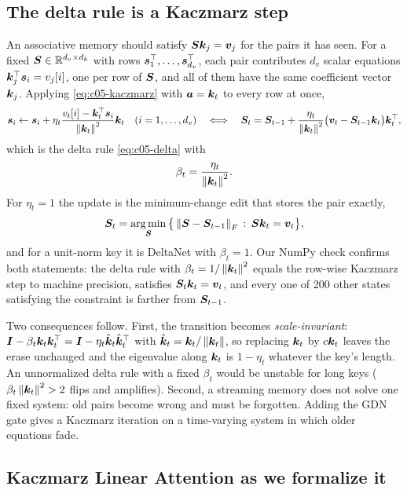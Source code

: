 \subsection{The delta rule is a Kaczmarz step}\label{sec:c05-kla-delta}

An associative memory should satisfy $\bm{S}\bm{k}_j = \bm{v}_j$ for the pairs it has seen. For a fixed
$\bm{S} \in \mathbb{R}^{d_v\times d_k}$ with rows $\bm{s}_1^{\top},\dots,\bm{s}_{d_v}^{\top}$, each pair contributes $d_v$
scalar equations $\bm{k}_j^{\top}\bm{s}_i = v_j[i]$, one per row of $\bm{S}$, and all of them have the same
coefficient vector $\bm{k}_j$. Applying \cref{eq:c05-kaczmarz} with $\bm{a} = \bm{k}_t$ to every row at once,
\[
  \bm{s}_i \gets \bm{s}_i + \eta_t\frac{v_t[i] - \bm{k}_t^{\top}\bm{s}_i}{\left\lVert \bm{k}_t\right\rVert^2}\bm{k}_t
  \quad(i = 1,\dots,d_v)
  \quad\Longleftrightarrow\quad
  \bm{S}_t = \bm{S}_{t-1} + \frac{\eta_t}{\left\lVert \bm{k}_t\right\rVert^2}\big(\bm{v}_t - \bm{S}_{t-1}\bm{k}_t\big)\bm{k}_t^{\top} ,
\]
which is the delta rule \cref{eq:c05-delta} with
\begin{equation}\label{eq:c05-kla-beta}
  \beta_t = \frac{\eta_t}{\left\lVert \bm{k}_t\right\rVert^2} .
\end{equation}
For $\eta_t = 1$ the update is the minimum-change edit that stores the pair exactly,
\[
  \bm{S}_t = \operatorname*{arg\,min}_{\bm{S}}\big\{\left\lVert \bm{S} - \bm{S}_{t-1}\right\rVert_F \,:\, \bm{S}\bm{k}_t = \bm{v}_t\big\},
\]
and for a unit-norm key it is DeltaNet with $\beta_t = 1$. Our NumPy check confirms both statements: the delta rule with
$\beta_t = 1/\left\lVert \bm{k}_t\right\rVert^2$ equals the row-wise Kaczmarz step to machine precision, satisfies
$\bm{S}_t\bm{k}_t = \bm{v}_t$, and every one of 200 other states satisfying the constraint is farther from
$\bm{S}_{t-1}$.

Two consequences follow. First, the transition becomes \emph{scale-invariant}:
$\bm{I} - \beta_t\bm{k}_t\bm{k}_t^{\top} = \bm{I} - \eta_t\hat{\bm{k}}_t\hat{\bm{k}}_t^{\top}$ with $\hat{\bm{k}}_t = \bm{k}_t/\left\lVert \bm{k}_t\right\rVert$,
so replacing $\bm{k}_t$ by $c\bm{k}_t$ leaves the erase unchanged and the eigenvalue along $\bm{k}_t$ is
$1 - \eta_t$ whatever the key's length. An unnormalized delta rule with a fixed $\beta_t$ would be
unstable for long keys ($\beta_t\left\lVert \bm{k}_t\right\rVert^2 > 2$ flips and amplifies). Second, a streaming memory
does not solve one fixed system: old pairs become wrong and must be forgotten. Adding the GDN gate
gives a Kaczmarz iteration on a time-varying system in which older equations fade.

\subsection{Kaczmarz Linear Attention as we formalize it}\label{sec:c05-kla-formal}

